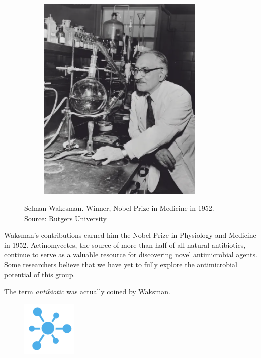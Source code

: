 \documentclass[
  letterpaper,
  DIV=11,
  numbers=noendperiod]{scrreprt}
\begin{document}
\begin{figure}

{\centering 

\begin{figure}

{\centering \includegraphics[width=3.125in,height=\textheight]{images/waksman.png}

}

\end{figure}

}

\caption{\label{fig-waksman}Selman Wakesman. Winner, Nobel Prize in
Medicine in 1952. Source: Rutgers University}

\end{figure}

Waksman's contributions earned him the Nobel Prize in Physiology and
Medicine in 1952. Actinomycetes, the source of more than half of all
natural antibiotics, continue to serve as a valuable resource for
discovering novel antimicrobial agents. Some researchers believe that we
have yet to fully explore the antimicrobial potential of this group.

The term \emph{antibiotic} was actually coined by Waksman.

\begin{figure}

{\centering \includegraphics[width=1.04167in,height=\textheight]{images/breakblue.png}

}

\end{figure}
\end{document}
